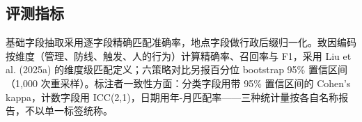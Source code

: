 \documentclass[11pt]{article}
\begin{document}
\subsection{{\cjkfont 评\allowbreak 测\allowbreak 指\allowbreak 标}}
{\cjkfont 基\allowbreak 础\allowbreak 字\allowbreak 段\allowbreak 抽\allowbreak 取\allowbreak 采\allowbreak 用\allowbreak 逐\allowbreak 字\allowbreak 段\allowbreak 精\allowbreak 确\allowbreak 匹\allowbreak 配\allowbreak 准\allowbreak 确\allowbreak 率\allowbreak ，\allowbreak 地\allowbreak 点\allowbreak 字\allowbreak 段\allowbreak 做\allowbreak 行\allowbreak 政\allowbreak 后\allowbreak 缀\allowbreak 归\allowbreak 一\allowbreak 化\allowbreak 。\allowbreak 致\allowbreak 因\allowbreak 编\allowbreak 码\allowbreak 按\allowbreak 维\allowbreak 度\allowbreak （\allowbreak 管\allowbreak 理\allowbreak 、\allowbreak 防\allowbreak 线\allowbreak 、\allowbreak 触\allowbreak 发\allowbreak 、\allowbreak 人\allowbreak 的\allowbreak 行\allowbreak 为\allowbreak ）\allowbreak 计\allowbreak 算\allowbreak 精\allowbreak 确\allowbreak 率\allowbreak 、\allowbreak 召\allowbreak 回\allowbreak 率\allowbreak 与} F1{\cjkfont ，\allowbreak 采\allowbreak 用} Liu et al. (2025a) {\cjkfont 的\allowbreak 维\allowbreak 度\allowbreak 级\allowbreak 匹\allowbreak 配\allowbreak 定\allowbreak 义\allowbreak ；\allowbreak 六\allowbreak 策\allowbreak 略\allowbreak 对\allowbreak 比\allowbreak 另\allowbreak 报\allowbreak 百\allowbreak 分\allowbreak 位} bootstrap 95\% {\cjkfont 置\allowbreak 信\allowbreak 区\allowbreak 间\allowbreak （}1,000 {\cjkfont 次\allowbreak 重\allowbreak 采\allowbreak 样\allowbreak ）\allowbreak 。\allowbreak 标\allowbreak 注\allowbreak 者\allowbreak 一\allowbreak 致\allowbreak 性\allowbreak 方\allowbreak 面\allowbreak ：\allowbreak 分\allowbreak 类\allowbreak 字\allowbreak 段\allowbreak 用\allowbreak 带} 95\% {\cjkfont 置\allowbreak 信\allowbreak 区\allowbreak 间\allowbreak 的} Cohen's kappa{\cjkfont ，\allowbreak 计\allowbreak 数\allowbreak 字\allowbreak 段\allowbreak 用} ICC(2,1){\cjkfont ，\allowbreak 日\allowbreak 期\allowbreak 用\allowbreak 年}-{\cjkfont 月\allowbreak 匹\allowbreak 配\allowbreak 率}------{\cjkfont 三\allowbreak 种\allowbreak 统\allowbreak 计\allowbreak 量\allowbreak 按\allowbreak 各\allowbreak 自\allowbreak 名\allowbreak 称\allowbreak 报\allowbreak 告\allowbreak ，\allowbreak 不\allowbreak 以\allowbreak 单\allowbreak 一\allowbreak 标\allowbreak 签\allowbreak 统\allowbreak 称\allowbreak 。}
\end{document}
